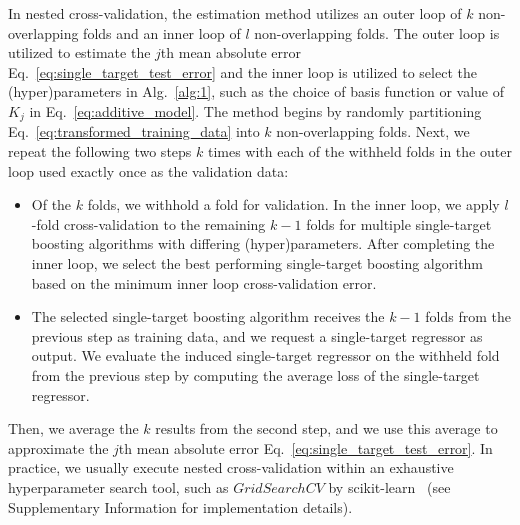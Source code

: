 \documentclass[aps,twocolumn,superscriptaddress,floatfix,preprintnumbers,showkeys]{revtex4}
\begin{document}
In nested cross-validation, the estimation method utilizes an outer loop of $k$ non-overlapping folds and an inner loop of $l$ non-overlapping folds. The outer loop is utilized to estimate the $j$th mean absolute error Eq.~\ref{eq:single_target_test_error} and the inner loop is utilized to select the (hyper)parameters in Alg.\ \ref{alg:1}, such as the choice of basis function or value of $K_{j}$ in Eq.~\ref{eq:additive_model}. The method begins by randomly partitioning Eq.~\ref{eq:transformed_training_data} into $k$ non-overlapping folds. Next, we repeat the following two steps $k$ times with each of the withheld folds in the outer loop used exactly once as the validation data:\
\begin{itemize}
\item Of the $k$ folds, we withhold a fold for validation. In the inner loop, we apply $l$-fold cross-validation to the remaining $k-1$ folds for multiple single-target boosting algorithms with differing (hyper)parameters. After completing the inner loop, we select the best performing single-target boosting algorithm based on the minimum inner loop cross-validation error.
\item The selected single-target boosting algorithm receives the $k-1$ folds from the previous step as training data, and we request a single-target regressor as output. We evaluate the induced single-target regressor on the withheld fold from the previous step by computing the average loss of the single-target regressor.
\end{itemize}
Then, we average the $k$ results from the second step, and we use this average to approximate the $j$th mean absolute error Eq.~\ref{eq:single_target_test_error}. In practice, we usually execute nested cross-validation within an exhaustive hyperparameter search tool, such as $GridSearchCV$ by scikit-learn~\cite{Sklearn_2011} (see Supplementary Information for implementation details).  
\end{document}
